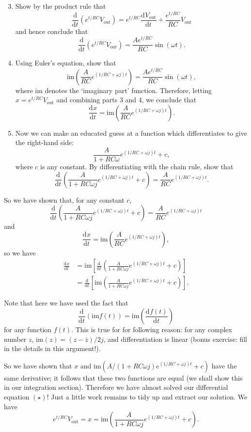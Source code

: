 \documentclass{article}
\newcommand{\deriv}[3][]{\frac{\mathrm{d}^{#1} #2}{\mathrm{d}#3^{#1}}}
\begin{document}
{\begin{enumerate}\setcounter{enumi}{2}
	\item Show by the product rule that
		\[\deriv{}{t}\left(e^{t/RC}V_\mathrm{out}\right) = e^{t/RC}\deriv{V_\mathrm{out}}{t}+\frac{e^{t/RC}}{RC}V_\mathrm{out}\]
		and hence conclude that
		\[\deriv{}{t}\left(e^{t/RC}V_\mathrm{out}\right) = \frac{Ae^{t/RC}}{RC}\sin(\omega t).\]
	\item Using Euler's equation, show that
		\[\mathrm{im}\left(\frac{A}{RC}e^{\left(1/RC+ \omega j\right)t}\right)=\frac{Ae^{t/RC}}{RC}\sin(\omega t),\]
		where $\mathrm{im}$ denotes the `imaginary part' function. Therefore, letting $x=e^{t/RC}V_\mathrm{out}$ and combining parts 3 and 4, we conclude that
		\[\deriv{x}{t}=\mathrm{im}\left(\frac{A}{RC}e^{\left(1/RC+ \omega j\right)t}\right).\]
	\item Now we can make an educated guess at a function which differentiates to give the right-hand side:
		\[\frac{A}{1+RC\omega}e^{\left(1/RC+\omega j\right)t} + c,\]
		where $c$ is any constant. By differentiating with the chain rule, show that
		\[\deriv{}{t}\left( \frac{A}{1+RC\omega j}e^{\left(1/RC+\omega j\right)t}  + c \right) = \frac{A}{RC}e^{\left(1/RC+\omega j\right)t}.\]
\end{enumerate}\bigskip


So we have shown that, for any constant $c$,
\[\deriv{}{t}\left(\frac{A}{1+RC\omega j}e^{(1/RC+\omega j)t}+c\right)=\frac{A}{RC}e^{(1/RC+\omega j)t}\]
and
\[\deriv{x}{t}=\mathrm{im}\left(\frac{A}{RC}e^{(1/RC+\omega j)t}\right),\]
so we have
\begin{align*}
	\deriv{x}{t}&=\mathrm{im}\left[\deriv{}{t}\left(\frac{A}{1+RC\omega j}e^{(1/RC+\omega j)t}+c\right)\right]\\
	&=\deriv{}{t}\left[\mathrm{im}\left(\frac{A}{1+RC\omega j}e^{(1/RC+\omega j)t}+c\right)\right].
\end{align*}

Note that here we have used the fact that
\[\deriv{}{t}\left(\mathrm{im}f(t)\right)=\mathrm{im}\left(\deriv{f(t)}{t}\right)\]
for any function $f(t)$. This is true for for following reason: for any complex number $z$, $\mathrm{im}(z)=(z-\bar{z})/2j$, and differentiation is linear (bonus exercise: fill in the details in this argument!).

So we have shown that $x$ and $\mathrm{im}\left(A/(1+RC\omega j)e^{(1/RC+\omega j)t}+c\right)$ have the same derivative; it follows that these two functions are equal (we shall show this in our integration section). Therefore we have almost solved our differential equation $(\star)$! Just a little work remains to tidy up and extract our solution. We have
\[e^{t/RC} V_\mathrm{out} =x= \mathrm{im}\left(\frac{A}{1+RC\omega j}e^{(1/RC+\omega j)t}+c\right).\]
\bigskip

}
\end{document}
